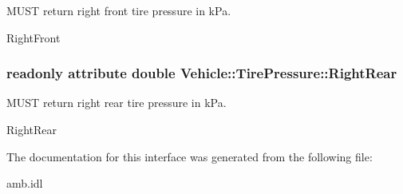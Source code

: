 M\-U\-S\-T return right front tire pressure in k\-Pa. 

Right\-Front \hypertarget{interfaceVehicle_1_1TirePressure_aa94fbfbf3bcbff99ab294e5193dd9d2c}{
\subsubsection[{Right\-Rear}]{\setlength{\rightskip}{0pt plus 5cm}readonly attribute double Vehicle\-::\-Tire\-Pressure\-::\-Right\-Rear}}\label{interfaceVehicle_1_1TirePressure_aa94fbfbf3bcbff99ab294e5193dd9d2c}


M\-U\-S\-T return right rear tire pressure in k\-Pa. 

Right\-Rear 

The documentation for this interface was generated from the following file\-:\begin{DoxyCompactItemize}
\item 
amb.\-idl\end{DoxyCompactItemize}
